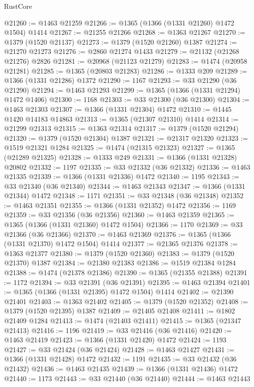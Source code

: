 \begin{lexlean}{RustCore}
\begin{coremodule}
@21260 := @1463 @21259
@21266 := @1365 (@1366 (@1331 @21260) @1472 @1504) @1414
@21267 := @21255 @21266
@21268 := @1363 @21267
@21270 := @1379 (@1520 @21137)
@21273 := @1379 (@1520 @21260) @1387
@21274 := @21270 @21273
@21276 := @2860 @21274 @1433
@21279 := @21132 (@21268 @21276) @2826
@21281 := @20968 (@21123 @21279)
@21283 := @1474 (@20958 @21281)
@21285 := @1365 (@20803 @21283)
@21286 := @1333 @209
@21289 := @1366 (@1331 @21286) @1372
@21290 := 1167
@21293 := @33 @21290 (@36 @21290)
@21294 := @1463 @21293
@21299 := @1365 (@1366 (@1331 @21294) @1472 @1406)
@21300 := 1168
@21303 := @33 @21300 (@36 @21300)
@21304 := @1463 @21303
@21307 := @1366 (@1331 @21304) @1472
@21310 := @1445 @1420 @14183 @14863
@21313 := @1365 (@21307 @21310) @1414
@21314 := @21299 @21313
@21315 := @1363 @21314
@21317 := @1379 (@1520 @21294)
@21320 := @1379 (@1520 @21304) @1387
@21321 := @21317 @21320
@21323 := @1519 @21321 @1284
@21325 := @1474 (@21315 @21323)
@21327 := @1365 (@21289 @21325)
@21328 := @1333 @249
@21331 := @1366 (@1331 @21328) @20802
@21332 := 1197
@21335 := @33 @21332 (@36 @21332)
@21336 := @1463 @21335
@21339 := @1366 (@1331 @21336) @1472
@21340 := 1195
@21343 := @33 @21340 (@36 @21340)
@21344 := @1463 @21343
@21347 := @1366 (@1331 @21344) @1472
@21348 := 1171
@21351 := @33 @21348 (@36 @21348)
@21352 := @1463 @21351
@21355 := @1366 (@1331 @21352) @1472
@21356 := 1169
@21359 := @33 @21356 (@36 @21356)
@21360 := @1463 @21359
@21365 := @1365 (@1366 (@1331 @21360) @1472 @1504)
@21366 := 1170
@21369 := @33 @21366 (@36 @21366)
@21370 := @1463 @21369
@21376 := @1365 (@1366 (@1331 @21370) @1472 @1504) @1414
@21377 := @21365 @21376
@21378 := @1363 @21377
@21380 := @1379 (@1520 @21360)
@21383 := @1379 (@1520 @21370) @1387
@21384 := @21380 @21383
@21386 := @1519 @21384 @1284
@21388 := @1474 (@21378 @21386)
@21390 := @1365 (@21355 @21388)
@21391 := 1172
@21394 := @33 @21391 (@36 @21391)
@21395 := @1463 @21394
@21401 := @1365 (@1366 (@1331 @21395) @1472 @1504) @1414
@21402 := @21390 @21401
@21403 := @1363 @21402
@21405 := @1379 (@1520 @21352)
@21408 := @1379 (@1520 @21395) @1387
@21409 := @21405 @21408
@21411 := @1802 @21409 @1284
@21413 := @1474 (@21403 @21411)
@21415 := @1365 (@21347 @21413)
@21416 := 1196
@21419 := @33 @21416 (@36 @21416)
@21420 := @1463 @21419
@21423 := @1366 (@1331 @21420) @1472
@21424 := 1193
@21427 := @33 @21424 (@36 @21424)
@21428 := @1463 @21427
@21431 := @1366 (@1331 @21428) @1472
@21432 := 1191
@21435 := @33 @21432 (@36 @21432)
@21436 := @1463 @21435
@21439 := @1366 (@1331 @21436) @1472
@21440 := 1173
@21443 := @33 @21440 (@36 @21440)
@21444 := @1463 @21443

\end{coremodule}
\end{lexlean}
